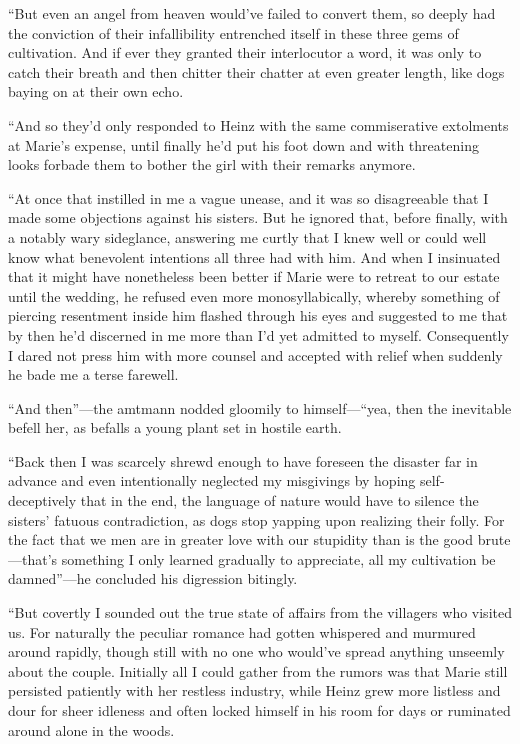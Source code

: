 \documentclass[12pt,a4paper]{article}
\begin{document}
“But even an angel from heaven would’ve failed to convert them, so deeply had the conviction of their infallibility entrenched itself in these three gems of cultivation. And if ever they granted their interlocutor a word, it was only to catch their breath and then chitter their chatter at even greater length, like dogs baying on at their own echo.

“And so they’d only responded to Heinz with the same commiserative extolments at Marie’s expense, until finally he’d put his foot down and with threatening looks forbade them to bother the girl with their remarks anymore.

“At once that instilled in me a vague unease, and it was so disagreeable that I made some objections against his sisters. But he ignored that, before finally, with a notably wary sideglance, answering me curtly that I knew well or could well know what benevolent intentions all three had with him. And when I insinuated that it might have nonetheless been better if Marie were to retreat to our estate until the wedding, he refused even more monosyllabically, whereby something of piercing resentment inside him flashed through his eyes and suggested to me that by then he’d discerned in me more than I’d yet admitted to myself. Consequently I dared not press him with more counsel and accepted with relief when suddenly he bade me a terse farewell.

“And then”—the amtmann nodded gloomily to himself—“yea, then the inevitable befell her, as befalls a young plant set in hostile earth.

“Back then I was scarcely shrewd enough to have foreseen the disaster far in advance and even intentionally neglected my misgivings by hoping self-deceptively that in the end, the language of nature would have to silence the sisters’ fatuous contradiction, as dogs stop yapping upon realizing their folly. For the fact that we men are in greater love with our stupidity than is the good brute—that’s something I only learned gradually to appreciate, all my cultivation be damned”—he concluded his digression bitingly.

“But covertly I sounded out the true state of affairs from the villagers who visited us. For naturally the peculiar romance had gotten whispered and murmured around rapidly, though still with no one who would’ve spread anything unseemly about the couple. Initially all I could gather from the rumors was that Marie still persisted patiently with her restless industry, while Heinz grew more listless and dour for sheer idleness and often locked himself in his room for days or ruminated around alone in the woods.
\end{document}
